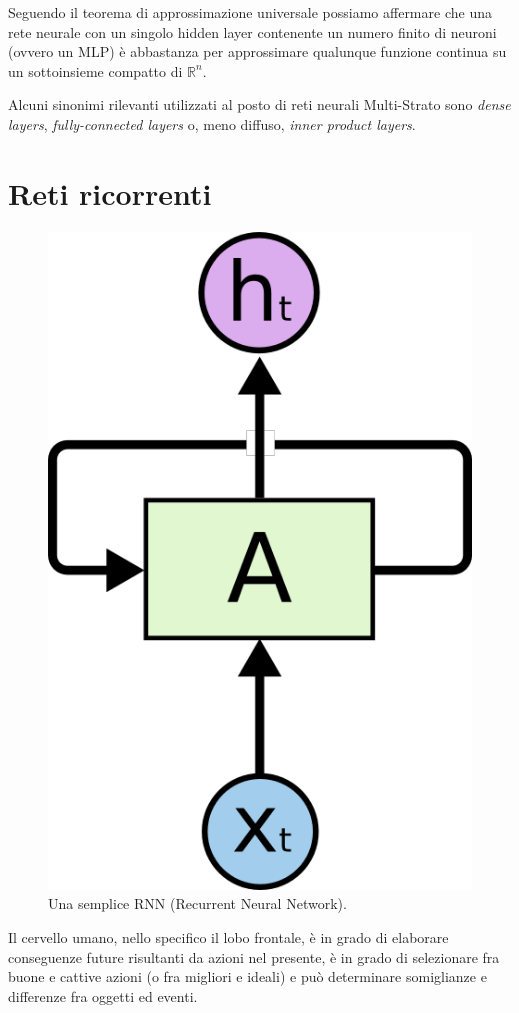 Seguendo il teorema di approssimazione universale \cite{approx} possiamo affermare che una rete neurale con un singolo hidden layer contenente un numero finito di neuroni (ovvero un MLP) è abbastanza per approssimare qualunque funzione continua su un sottoinsieme compatto di $\mathbb{R}^n$.

Alcuni sinonimi rilevanti utilizzati al posto di reti neurali Multi-Strato 
sono \textit{dense layers}, \textit{fully-connected layers} o, meno diffuso, \textit{inner product layers}.
\section{Reti ricorrenti}
\begin{figure}[h]
	\centering
	\includegraphics{img/rnn.png}
	\caption{Una semplice RNN (Recurrent Neural Network).}
	\label{fig:1.4}
\end{figure}
Il cervello umano, nello specifico il lobo frontale, è in grado di elaborare conseguenze future risultanti da azioni nel presente, è in grado di selezionare fra buone e cattive azioni (o fra migliori e ideali) e può determinare somiglianze e differenze fra oggetti ed eventi.

